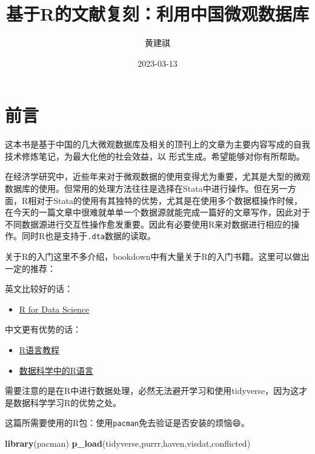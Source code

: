 \documentclass[
]{book}
\title{基于R的文献复刻：利用中国微观数据库}
\author{黄建祺}
\date{2023-03-13}
\newenvironment{Shaded}{\begin{snugshade}}{\end{snugshade}}
\newcommand{\FunctionTok}[1]{\textcolor[rgb]{0.13,0.29,0.53}{\textbf{#1}}}
\newcommand{\NormalTok}[1]{#1}
\providecommand{\tightlist}{%
  \setlength{\itemsep}{0pt}\setlength{\parskip}{0pt}}
\begin{document}
\maketitle

{
\setcounter{tocdepth}{1}
\tableofcontents
}
\hypertarget{ux524dux8a00}{%
\chapter*{前言}\label{ux524dux8a00}}

这本书是基于中国的几大微观数据库及相关的顶刊上的文章为主要内容写成的自我技术修炼笔记，为最大化他的社会效益，以 \citep{R-bookdown} 形式生成。希望能够对你有所帮助。

在经济学研究中，近些年来对于微观数据的使用变得尤为重要，尤其是大型的微观数据库的使用。但常用的处理方法往往是选择在Stata中进行操作。但在另一方面，R相对于Stata的使用有其独特的优势，尤其是在使用多个数据框操作时候，在今天的一篇文章中很难就单单一个数据源就能完成一篇好的文章写作，因此对于不同数据源进行交互性操作愈发重要。因此有必要使用R来对数据进行相应的操作。同时R也是支持于\texttt{.dta}数据的读取。

关于R的入门这里不多介绍，bookdown中有大量关于R的入门书籍。这里可以做出一定的推荐：

英文比较好的话：

\begin{itemize}
\tightlist
\item
  \href{https://r4ds.had.co.nz/}{R for Data Science}
\end{itemize}

中文更有优势的话：

\begin{itemize}
\item
  \href{https://www.math.pku.edu.cn/teachers/lidf/docs/Rbook/html/_Rbook/index.html}{R语言教程}
\item
  \href{https://bookdown.org/wangminjie/R4DS/}{数据科学中的R语言}
\end{itemize}

需要注意的是在R中进行数据处理，必然无法避开学习和使用tidyverse，因为这才是数据科学学习R的优势之处。

这篇所需要使用的R包：使用\texttt{pacman}免去验证是否安装的烦恼😄。

\begin{Shaded}
\begin{Highlighting}[]
\FunctionTok{library}\NormalTok{(pacman)}
\FunctionTok{p\_load}\NormalTok{(tidyverse,purrr,haven,visdat,conflicted)}
\end{Highlighting}
\end{Shaded}
\end{document}

